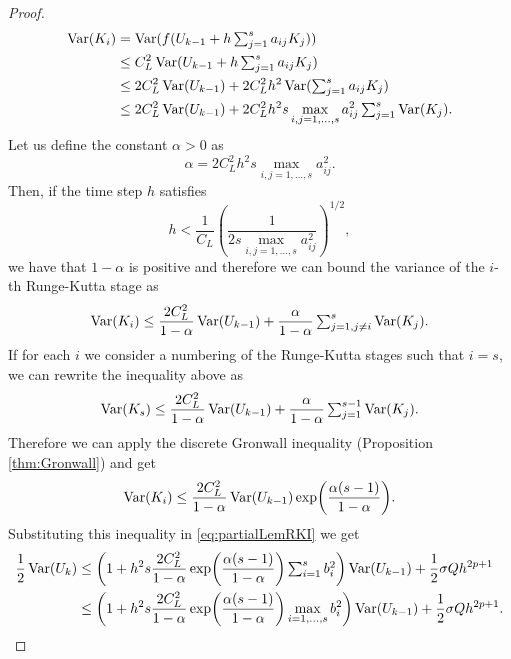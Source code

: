\begin{proof}
\begin{equation}
\begin{aligned}
\operatorname{Var}(K_i) &= \operatorname{Var}(f(U_{k-1} + h\textstyle\sum_{j=1}^{s}a_{ij}K_j)) \\
&\leq C_L^2 \operatorname{Var}(U_{k-1} + h\textstyle\sum_{j=1}^{s}a_{ij}K_j) \\
&\leq 2C_L^2 \operatorname{Var}(U_{k-1}) + 2C_L^2h^2\operatorname{Var}(\textstyle\sum_{j=1}^{s}a_{ij}K_j)\\
&\leq 2C_L^2 \operatorname{Var}(U_{k-1}) + 2C_L^2h^2s\max_{i,j=1,\ldots,s}a_{ij}^2 \textstyle\sum_{j=1}^{s}\operatorname{Var}(K_j).
\end{aligned}
\end{equation}
Let us define the constant $\alpha > 0$ as
\begin{equation}
\alpha = 2C_L^2h^2s\max_{i,j=1,\ldots,s}a_{ij}^2.
\end{equation}
Then, if the time step $h$ satisfies
\begin{equation}
h < \frac{1}{C_L}\left(\frac{1}{2s\max_{i,j=1,\ldots,s}a_{ij}^2}\right)^{1/2},
\end{equation}
we have that $1 - \alpha$ is positive and therefore we can bound the variance of the $i$-th Runge-Kutta stage as
\begin{equation}
\operatorname{Var}(K_i) \leq \frac{2C_L^2}{1 - \alpha} \operatorname{Var}(U_{k-1}) + \frac{\alpha}{1-\alpha}\textstyle\sum_{j=1, j\neq i}^{s}\operatorname{Var}(K_j). 
\end{equation}
If for each $i$ we consider a numbering of the Runge-Kutta stages such that $i = s$, we can rewrite the inequality above as
\begin{equation}
\operatorname{Var}(K_s) \leq \frac{2C_L^2}{1 - \alpha} \operatorname{Var}(U_{k-1}) + \frac{\alpha}{1-\alpha}\textstyle\sum_{j=1}^{s-1}\operatorname{Var}(K_j).
\end{equation}
Therefore we can apply the discrete Gronwall inequality (Proposition \ref{thm:Gronwall}) and get
\begin{equation}
\operatorname{Var}(K_i) \leq \frac{2C_L^2}{1 - \alpha} \operatorname{Var}(U_{k-1})\exp(\frac{\alpha(s-1)}{1-\alpha}).
\end{equation}
Substituting this inequality in \eqref{eq:partialLemRKI} we get
\begin{equation}
\begin{aligned}
\frac{1}{2}\Var(U_k) &\leq \left(1 + h^2s\frac{2C_L^2}{1 - \alpha}\exp(\frac{\alpha(s-1)}{1-\alpha})\sksum_{i=1}^s b_i^2\right)\Var(U_{k-1}) + \frac{1}{2}\sigma Q h^{2p+1} \\
&\leq \left(1 + h^2s\frac{2C_L^2}{1 - \alpha}\exp(\frac{\alpha(s-1)}{1-\alpha})\max_{i=1,\ldots,s} b_i^2\right)\Var(U_{k-1}) + \frac{1}{2}\sigma Q h^{2p+1}.
\end{aligned}

\end{equation}
\end{proof}
